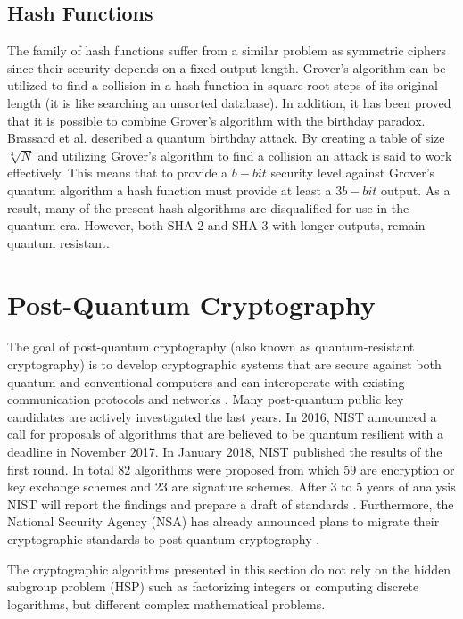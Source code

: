 \documentclass[conference, letterpaper]{IEEEtran}
\begin{document}
\subsection{Hash Functions}
The family of hash functions suffer from a similar problem as symmetric ciphers since their security depends on a fixed output length. Grover's algorithm can be utilized to find a collision in a hash function in square root steps of its original length (it is like searching an unsorted database). In addition, it has been proved that it is possible to combine Grover's algorithm with the birthday paradox. Brassard et al. \cite{Brassard1998} described a quantum birthday attack. By creating a table of size $\sqrt[3]{N}$ and utilizing Grover’s algorithm to find a collision an attack is said to work effectively. This means that to provide a $b-bit$ security level against Grover's quantum algorithm a hash function must provide at least a $3b-bit$ output. As a result, many of the present hash algorithms are disqualified for use in the quantum era. However, both SHA-2 and SHA-3 with longer outputs, remain quantum resistant.

\section{Post-Quantum Cryptography}
The goal of post-quantum cryptography (also known as quantum-resistant cryptography) is to develop cryptographic systems that are secure against both quantum and conventional computers and can interoperate with existing communication protocols and networks \cite{Chen2016}. Many post-quantum public key candidates are actively investigated the last years. In 2016, NIST announced a call for proposals of algorithms that are believed to be quantum resilient with a deadline in November 2017. In January 2018, NIST published the results of the first round. In total 82 algorithms were proposed from which 59 are encryption or key exchange schemes and 23 are signature schemes. After 3 to 5 years of analysis NIST will report the findings and prepare a draft of standards \cite{Asiacrypt_2017_Moody}. Furthermore, the National Security Agency (NSA) has already announced plans to migrate their cryptographic standards to post-quantum cryptography \cite{ArsTechnica2015}.

The cryptographic algorithms presented in this section do not rely on the hidden subgroup problem (HSP) such as factorizing integers or computing discrete logarithms, but different complex mathematical problems.
\end{document}
